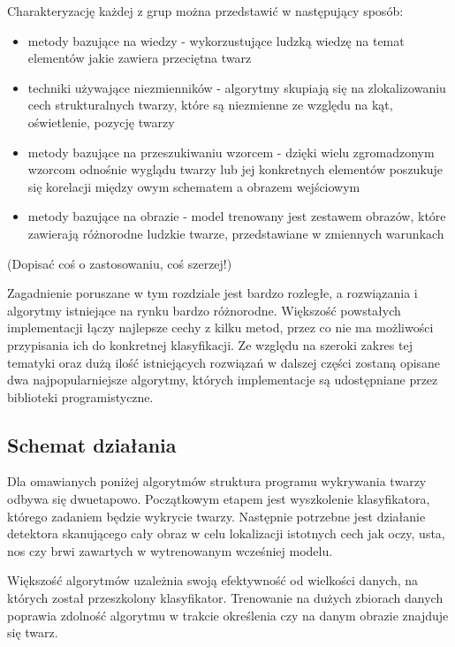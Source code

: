 Charakteryzację każdej z grup \cite{Yang} można przedstawić w następujący sposób:
\begin{itemize}
    \item metody bazujące na wiedzy - wykorzustujące ludzką wiedzę na temat elementów jakie zawiera przeciętna twarz
    \item techniki używające niezmienników - algorytmy skupiają się na zlokalizowaniu cech strukturalnych twarzy, które są niezmienne ze względu na kąt, oświetlenie, pozycję twarzy
    \item metody bazujące na przeszukiwaniu wzorcem - dzięki wielu zgromadzonym wzorcom odnośnie wyglądu twarzy lub jej konkretnych elementów poszukuje się korelacji między owym schematem a obrazem wejściowym
    \item metody bazujące na obrazie - model trenowany jest zestawem obrazów, które zawierają różnorodne ludzkie twarze, przedstawiane w zmiennych warunkach
\end{itemize}

(Dopisać coś o zastosowaniu, coś szerzej!)

Zagadnienie poruszane w tym rozdziale jest bardzo rozległe, a rozwiązania i algorytmy istniejące na rynku bardzo różnorodne. Większość powstałych implementacji łączy najlepsze cechy z kilku metod, przez co nie ma możliwości przypisania ich do konkretnej klasyfikacji. Ze względu na szeroki zakres tej 
tematyki oraz dużą ilość istniejących rozwiązań w dalszej części zostaną opisane dwa najpopularniejsze algorytmy, których implementacje są udostępniane przez biblioteki programistyczne.

\subsection{Schemat działania}

Dla omawianych poniżej algorytmów struktura programu wykrywania twarzy odbywa się dwuetapowo. Początkowym etapem jest wyszkolenie klasyfikatora, którego zadaniem będzie wykrycie twarzy. Następnie potrzebne jest działanie detektora skanującego cały obraz w celu lokalizacji istotnych cech jak oczy, usta, nos czy brwi zawartych w wytrenowanym wcześniej modelu.

Większość algorytmów uzależnia swoją efektywność od wielkości danych, na których został przeszkolony klasyfikator. Trenowanie na dużych zbiorach danych poprawia zdolność algorytmu w trakcie określenia czy na danym obrazie znajduje się twarz. \cite{fDetection}

